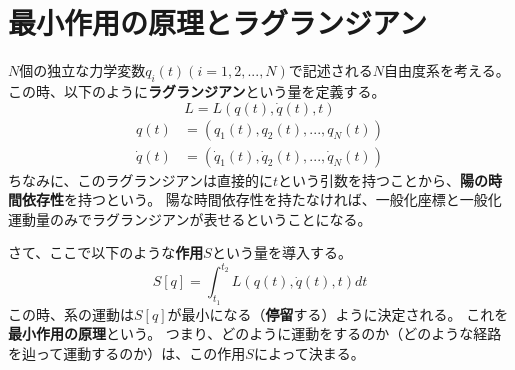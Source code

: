 \documentclass[a4paper]{jsreport}
\begin{document}
        \section{最小作用の原理とラグランジアン}
            $N$個の独立な力学変数$q_i(t)(i=1,2, ..., N)$で記述される$N$自由度系を考える。
            この時、以下のように\textbf{ラグランジアン}という量を定義する。
            \begin{equation}
                L = L(q(t), \dot{q}(t), t)
            \end{equation}
            \begin{align}
                q(t) &= (q_1(t), q_2(t), ..., q_N(t)) \\
                \dot{q}(t) &= (\dot{q}_1(t), \dot{q}_2(t), ..., \dot{q}_N(t))
            \end{align}
            ちなみに、このラグランジアンは直接的に$t$という引数を持つことから、\textbf{陽の時間依存性}を持つという。
            陽な時間依存性を持たなければ、一般化座標と一般化運動量のみでラグランジアンが表せるということになる。\par
            さて、ここで以下のような\textbf{作用$S$}という量を導入する。
            \begin{equation}
                S[q] = \int_{t_1}^{t_2} L(q(t), \dot{q}(t), t) dt
            \end{equation}
            この時、系の運動は$S[q]$が最小になる（\textbf{停留}する）ように決定される。
            これを\textbf{最小作用の原理}という。
            つまり、どのように運動をするのか（どのような経路を辿って運動するのか）は、この作用$S$によって決まる。
\end{document}
